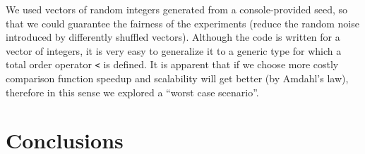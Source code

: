 \documentclass[12pt]{article}
\begin{document}
We used vectors of random integers generated from a console-provided
seed, so that we could guarantee the fairness of the experiments
(reduce the random noise introduced by differently shuffled
vectors). Although the code is written for a vector of integers, it is
very easy to generalize it to a generic type for which a total order
operator \texttt{<} is defined. It is apparent that if we choose more
costly comparison function speedup and scalability will get better
(by Amdahl's law), therefore in this sense we explored a ``worst case
scenario''.




\section{Conclusions}


  

\end{document}
